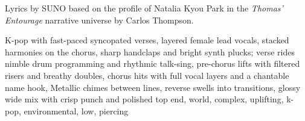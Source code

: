 
\begin{notes}
Lyrics by SUNO based on the profile of Natalia Kyou Park in the \emph{Thomas’ Entourage} narrative universe by Carlos Thompson.
\end{notes}
\begin{style}
K-pop with fast-paced syncopated verses, layered female lead vocals, stacked harmonies on the chorus, sharp handclaps and bright synth plucks; verse rides nimble drum programming and rhythmic talk-sing, pre-chorus lifts with filtered risers and breathy doubles, chorus hits with full vocal layers and a chantable name hook, Metallic chimes between lines, reverse swells into transitions, glossy wide mix with crisp punch and polished top end, world, complex, uplifting, k-pop, environmental, low, piercing
\end{style}
